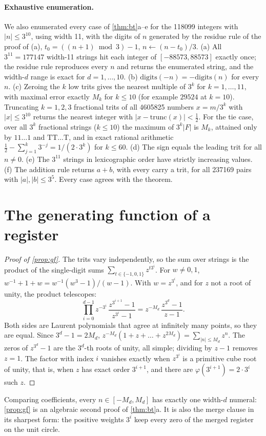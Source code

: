 \documentclass[11pt]{article}
\theoremstyle{definition}\newtheorem{definition}[theorem]{Definition}
\theoremstyle{remark}\newtheorem{remark}[theorem]{Remark}
\newcommand{\T}{\mathrm{T}}
\begin{document}
\paragraph{Exhaustive enumeration.} We also enumerated every case of \cref{thm:bt}a--e for the 118099 integers with $|n|\le3^{10}$, using width 11, with the digits of $n$ generated by the residue rule of the proof of (a), $t_0=((n+1)\bmod 3)-1$, $n\leftarrow(n-t_0)/3$. (a) All $3^{11}=177147$ width-11 strings hit each integer of $[-88573,88573]$ exactly once; the residue rule reproduces every $n$ and returns the enumerated string, and the width-$d$ range is exact for $d=1,\dots,10$. (b) $\mathrm{digits}(-n)=-\mathrm{digits}(n)$ for every $n$. (c) Zeroing the $k$ low trits gives the nearest multiple of $3^k$ for $k=1,\dots,11$, with maximal error exactly $M_k$ for $k\le10$ (for example $29524$ at $k=10$). Truncating $k=1,2,3$ fractional trits of all 4605825 numbers $x=m/3^k$ with $|x|\le3^{10}$ returns the nearest integer with $|x-\mathrm{trunc}(x)|<\frac12$. For the tie case, over all $3^k$ fractional strings ($k\le10$) the maximum of $3^k|F|$ is $M_k$, attained only by $11\ldots1$ and $\T\T\ldots\T$, and in exact rational arithmetic $\frac12-\sum_{j=1}^k3^{-j}=1/(2\cdot3^k)$ for $k\le60$. (d) The sign equals the leading trit for all $n\ne0$. (e) The $3^{11}$ strings in lexicographic order have strictly increasing values. (f) The addition rule returns $a+b$, with every carry a trit, for all 237169 pairs with $|a|,|b|\le3^5$. Every case agrees with the theorem.

\section{The generating function of a register}\label{sec:gf}
\begin{proof}[Proof of \cref{prop:gf}]
The trits vary independently, so the sum over strings is the product of the single-digit sums $\sum_{t\in\{-1,0,1\}}z^{t3^i}$. For $w\ne0,1$, $w^{-1}+1+w=w^{-1}(w^3-1)/(w-1)$. With $w=z^{3^i}$, and for $z$ not a root of unity, the product telescopes:
\[
\prod_{i=0}^{d-1}z^{-3^i}\,\frac{z^{3^{i+1}}-1}{z^{3^i}-1}=z^{-M_d}\,\frac{z^{3^d}-1}{z-1}.
\]
Both sides are Laurent polynomials that agree at infinitely many points, so they are equal. Since $3^d-1=2M_d$, $z^{-M_d}(1+z+\dots+z^{2M_d})=\sum_{|n|\le M_d}z^n$. The zeros of $z^{3^d}-1$ are the $3^d$-th roots of unity, all simple; dividing by $z-1$ removes $z=1$. The factor with index $i$ vanishes exactly when $z^{3^i}$ is a primitive cube root of unity, that is, when $z$ has exact order $3^{i+1}$, and there are $\varphi(3^{i+1})=2\cdot3^i$ such $z$.
\end{proof}
Comparing coefficients, every $n\in[-M_d,M_d]$ has exactly one width-$d$ numeral: \cref{prop:gf} is an algebraic second proof of \cref{thm:bt}a. It is also the merge clause in its sharpest form: the positive weights $3^i$ keep every zero of the merged register on the unit circle.
\end{document}
